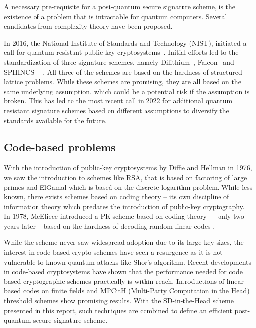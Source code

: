 \documentclass[twoside,11pt,openright]{report}
\theoremstyle{definition}
\theoremstyle{plain}
\begin{document}
A necessary pre-requisite for a post-quantum secure signature scheme, is the existence of a problem that is intractable for quantum computers. Several candidates from complexity theory have been proposed.

In 2016, the National Institute of Standards and Technology (NIST), initiated a call for quantum resistant public-key cryptosystems~\cite{nistcall}. Initial efforts led to the standardization of three signature schemes, namely Dilithium~\cite{ducas2018crystals}, Falcon~\cite{fouque2018falcon} and SPHINCS+~\cite{bernstein2019sphincs+}. All three of the schemes are based on the hardness of structured lattice problems. While these schemes are promising, they are all based on the same underlying assumption, which could be a potential risk if the assumption is broken. This has led to the most recent call in 2022 for additional quantum resistant signature schemes based on different assumptions to diversify the standards available for the future.

\subsection{Code-based problems}

With the introduction of public-key cryptosystems by Diffie and Hellman in 1976, we saw the introduction to schemes like RSA, that is based on factoring of large primes and ElGamal which is based on the discrete logarithm problem. While less known, there exists schemes based on coding theory -- its own discipline of information theory which predates the introduction of public-key cryptography. In 1978, McEliece introduced a PK scheme based on coding theory~\cite{mceliece1978public} -- only two years later -- based on the hardness of decoding random linear codes \cite{berlekamp1978inherent}.

While the scheme never saw widespread adoption due to its large key sizes, the interest in code-based crypto-schemes have seen a resurgence as it is not vulnerable to known quantum attacks like Shor's algorithm. Recent developments in code-based cryptosystems have shown that the performance needed for code based cryptographic schemes practically is within reach. Introductions of linear based codes on finite fields and MPCitH (Multi-Party Computation in the Head) threshold schemes \cite{baum2020concretely} show promising results. With the SD-in-the-Head scheme~\cite{aguilarsyndrome11,feneuil2023threshold} presented in this report, such techniques are combined to define an efficient post-quantum secure signature scheme.
\end{document}
